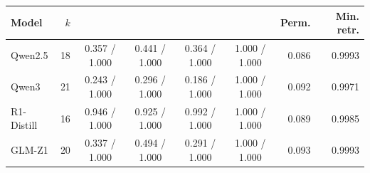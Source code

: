 \begin{tabular}{@{}lrccccrr@{}}
\toprule
Model & $k$ & \AlgOne{} & \DiffPCA{} & \Pooled{} & \Rand{} & Perm. & Min. retr. \\
\midrule
Qwen2.5 & 18 & 0.357 / 1.000 & 0.441 / 1.000 & 0.364 / 1.000 & 1.000 / 1.000 & 0.086 & 0.9993 \\
Qwen3 & 21 & 0.243 / 1.000 & 0.296 / 1.000 & 0.186 / 1.000 & 1.000 / 1.000 & 0.092 & 0.9971 \\
R1-Distill & 16 & 0.946 / 1.000 & 0.925 / 1.000 & 0.992 / 1.000 & 1.000 / 1.000 & 0.089 & 0.9985 \\
GLM-Z1 & 20 & 0.337 / 1.000 & 0.494 / 1.000 & 0.291 / 1.000 & 1.000 / 1.000 & 0.093 & 0.9993 \\
\bottomrule
\end{tabular}
